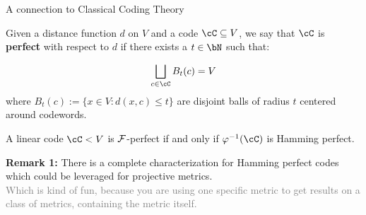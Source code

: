 

\begin{frame}{A connection to Classical Coding Theory}

\begin{definition}
    Given a distance function \(d\) on \(V\) and a code \(\cC \subseteq V\), we say that \(\cC\) is \textbf{perfect} with respect to \(d\) if there exists a \(t \in \bN\) such that:

    \begin{equation}
        \bigsqcup_{c \in \cC}B_t(c) = V
    \end{equation}
    where \(B_t(c) := \{x \in V : d(x,c) \leq t\}\) are disjoint balls of radius \(t\) centered around codewords.
\end{definition}
\pause
	\begin{proposition}
		A linear code \(\cC < V\) is \(\operatorname{\mathcal{F}}\)-perfect if and only if \(\varphi^{-1}(\cC)\) is Hamming perfect.
	 \end{proposition}
	 \pause
\textbf{Remark 1:} There is a complete characterization for Hamming perfect codes which could be leveraged for projective metrics. \\ 
\pause \textcolor{gray}{Which is kind of fun, because you are using one specific metric to get results on a class of metrics, containing the metric itself.}
\end{frame}

